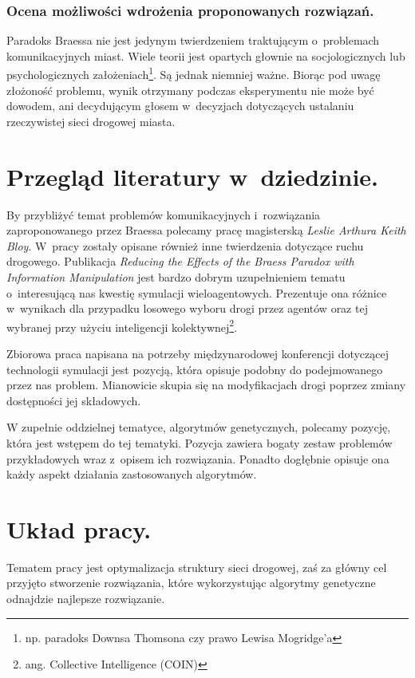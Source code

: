 \documentclass[twoside,12pt]{report}
\begin{document}
\subsubsection{Ocena możliwości wdrożenia proponowanych rozwiązań.}
Paradoks Braessa nie jest jedynym twierdzeniem traktującym o~problemach komunikacyjnych miast. Wiele teorii jest opartych głownie na socjologicznych lub psychologicznych założeniach\footnote{np. paradoks Downsa Thomsona\cite{downs} czy prawo Lewisa Mogridge’a\cite{lewis}}. Są jednak niemniej ważne. Biorąc pod uwagę złożoność problemu, wynik otrzymany podczas eksperymentu nie może być dowodem, ani decydującym głosem w~decyzjach dotyczących ustalaniu rzeczywistej sieci drogowej miasta. 


\section{Przegląd literatury w~dziedzinie.}
By przybliżyć temat problemów komunikacyjnych i~rozwiązania zaproponowanego przez Braessa polecamy pracę magisterską \textit{Leslie Arthura Keith Bloy}\cite{investigation}. W~pracy zostały opisane również inne twierdzenia dotyczące ruchu drogowego. Publikacja \textit{Reducing the Effects of the Braess Paradox with Information Manipulation}\cite{reducingtheeffects} jest bardzo dobrym uzupełnieniem tematu o~interesującą nas kwestię symulacji wieloagentowych. Prezentuje ona różnice w~wynikach dla przypadku losowego wyboru drogi przez agentów oraz tej wybranej przy użyciu inteligencji kolektywnej\footnote{ang. Collective Intelligence (COIN)}. 

Zbiorowa praca napisana na potrzeby międzynarodowej konferencji dotyczącej technologii symulacji\cite{reducingtheeffects} jest pozycją, która opisuje podobny do podejmowanego przez nas problem. Mianowicie skupia się na modyfikacjach drogi poprzez zmiany dostępności jej składowych.

W zupełnie oddzielnej tematyce, algorytmów genetycznych, polecamy pozycję, która jest wstępem do tej tematyki\cite{gene}. Pozycja zawiera bogaty zestaw problemów przykładowych wraz z~opisem ich rozwiązania. Ponadto dogłębnie opisuje ona każdy aspekt działania zastosowanych algorytmów. 

\section{Układ pracy.}
Tematem pracy jest optymalizacja struktury sieci drogowej, zaś za główny cel przyjęto stworzenie rozwiązania, które wykorzystując algorytmy genetyczne odnajdzie najlepsze rozwiązanie.
 
\end{document}
